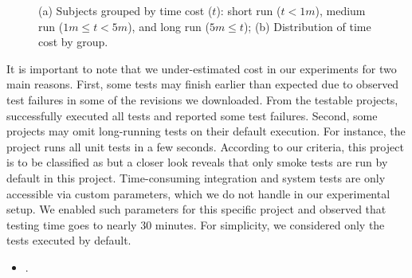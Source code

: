 \begin{figure}[ht]
\begin{subfigure}{0.25\textwidth}
        \caption{\label{fig:rq1-boxplot}}
    \end{subfigure}%
    \caption{(a) Subjects grouped by time cost ($t$): short run ($t <
    1m$), medium run ($1m \le t < 5m$), and long run ($5m \le t$); (b)
    Distribution of time cost by group.}
\end{figure}


It is important to note that we under-estimated cost in our
experiments for two main reasons.  First, some tests may finish
earlier than expected due to observed test failures in some of the
revisions we downloaded.  From the \numSubjs{} testable projects,
\numSubjsPass{} successfully executed all tests and \numSubjsFail{}
reported some test failures.  Second, some projects may omit
long-running tests on their default execution. For instance, the
project  runs all unit tests in a few
seconds.  According to our criteria, this project is to be classified
as \shortg{} but a closer look reveals that only smoke tests are run
by default in this project.  Time-consuming integration and system
tests are only accessible via custom parameters, which we do not
handle in our experimental setup.  We enabled such parameters for this
specific project and observed that testing time goes to nearly 30
minutes.  For simplicity, we considered only the tests executed by
default.

\vspace{1ex}
\begin{center}
\end{center}
\vspace{1ex}


\begin{itemize}
    \item \numRQB. \textbf{\RQB}
\end{itemize}

